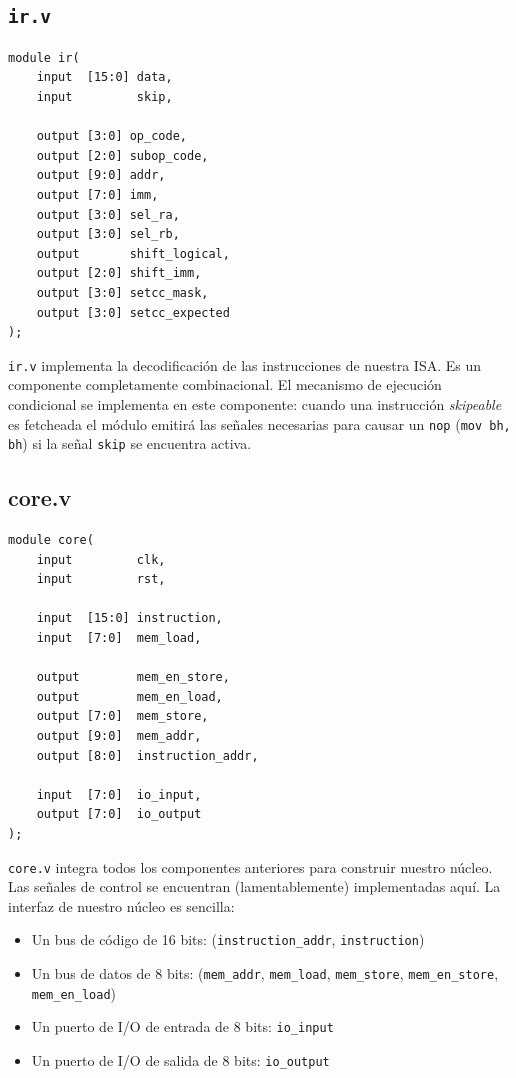 \documentclass{article}
\begin{document}
\subsection{\texttt{ir.v}}
\begin{verbatim}
module ir(
    input  [15:0] data,
    input         skip,

    output [3:0] op_code,
    output [2:0] subop_code,
    output [9:0] addr,
    output [7:0] imm,
    output [3:0] sel_ra,
    output [3:0] sel_rb,
    output       shift_logical,
    output [2:0] shift_imm,
    output [3:0] setcc_mask,
    output [3:0] setcc_expected
);
\end{verbatim}
\texttt{ir.v} implementa la decodificación de las instrucciones de nuestra ISA. Es un componente completamente combinacional. El mecanismo de ejecución condicional se implementa en este componente: cuando una instrucción \emph{skipeable} es fetcheada el módulo emitirá las señales necesarias para causar un \texttt{nop} (\texttt{mov bh, bh}) si la señal \texttt{skip} se encuentra activa.

\subsection{core.v}
\begin{verbatim}
module core(
    input         clk,
    input         rst,

    input  [15:0] instruction,
    input  [7:0]  mem_load,

    output        mem_en_store,
    output        mem_en_load,
    output [7:0]  mem_store,
    output [9:0]  mem_addr,
    output [8:0]  instruction_addr,

    input  [7:0]  io_input,
    output [7:0]  io_output
);
\end{verbatim}

\texttt{core.v} integra todos los componentes anteriores para construir nuestro núcleo. Las señales de control se encuentran (lamentablemente) implementadas aquí. La interfaz de nuestro núcleo es sencilla:
\begin{itemize}
    \item Un bus de código de 16 bits: (\texttt{instruction\_addr}, \texttt{instruction})
    \item Un bus de datos de 8 bits: (\texttt{mem\_addr}, \texttt{mem\_load}, \texttt{mem\_store}, \texttt{mem\_en\_store}, \texttt{mem\_en\_load})
    \item Un puerto de I/O de entrada de 8 bits: \texttt{io\_input}
    \item Un puerto de I/O de salida de 8 bits: \texttt{io\_output}
\end{itemize}
\end{document}
